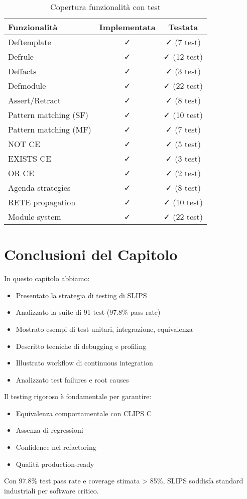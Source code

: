\begin{table}[h]
\centering
\begin{tabular}{@{}lcc@{}}
\toprule
\textbf{Funzionalità} & \textbf{Implementata} & \textbf{Testata} \\
\midrule
Deftemplate & ✓ & ✓ (7 test) \\
Defrule & ✓ & ✓ (12 test) \\
Deffacts & ✓ & ✓ (3 test) \\
Defmodule & ✓ & ✓ (22 test) \\
Assert/Retract & ✓ & ✓ (8 test) \\
Pattern matching (SF) & ✓ & ✓ (10 test) \\
Pattern matching (MF) & ✓ & ✓ (7 test) \\
NOT CE & ✓ & ✓ (5 test) \\
EXISTS CE & ✓ & ✓ (3 test) \\
OR CE & ✓ & ✓ (2 test) \\
Agenda strategies & ✓ & ✓ (8 test) \\
RETE propagation & ✓ & ✓ (10 test) \\
Module system & ✓ & ✓ (22 test) \\
\bottomrule
\end{tabular}
\caption{Copertura funzionalità con test}
\label{tab:feature_coverage}
\end{table}

\section{Conclusioni del Capitolo}

In questo capitolo abbiamo:

\begin{itemize}
\item Presentato la strategia di testing di SLIPS
\item Analizzato la suite di 91 test (97.8\% pass rate)
\item Mostrato esempi di test unitari, integrazione, equivalenza
\item Descritto tecniche di debugging e profiling
\item Illustrato workflow di continuous integration
\item Analizzato test failures e root causes
\end{itemize}

Il testing rigoroso è fondamentale per garantire:
\begin{itemize}
\item Equivalenza comportamentale con CLIPS C
\item Assenza di regressioni
\item Confidence nel refactoring
\item Qualità production-ready
\end{itemize}

\begin{successbox}
Con 97.8\% test pass rate e coverage stimata > 85\%, SLIPS soddisfa standard industriali per software critico.
\end{successbox}

